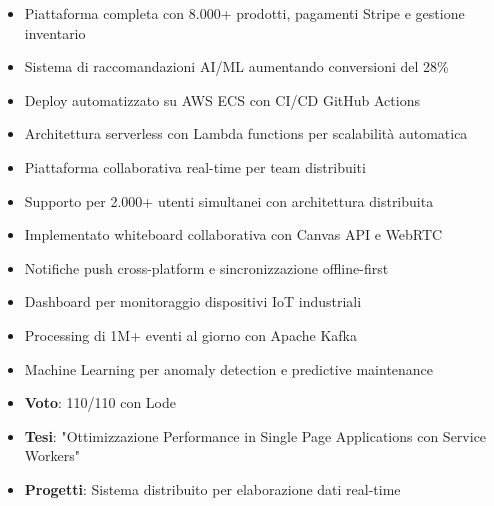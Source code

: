 \documentclass[10pt,a4paper,ragged2e,withhyper]{altacv}
\begin{document}

\begin{itemize}
\item Piattaforma completa con 8.000+ prodotti, pagamenti Stripe e gestione inventario
\item Sistema di raccomandazioni AI/ML aumentando conversioni del 28\%
\item Deploy automatizzato su AWS ECS con CI/CD GitHub Actions
\item Architettura serverless con Lambda functions per scalabilità automatica
\end{itemize}

\divider

\begin{itemize}
\item Piattaforma collaborativa real-time per team distribuiti
\item Supporto per 2.000+ utenti simultanei con architettura distribuita
\item Implementato whiteboard collaborativa con Canvas API e WebRTC
\item Notifiche push cross-platform e sincronizzazione offline-first
\end{itemize}

\divider

\begin{itemize}
\item Dashboard per monitoraggio dispositivi IoT industriali
\item Processing di 1M+ eventi al giorno con Apache Kafka
\item Machine Learning per anomaly detection e predictive maintenance
\end{itemize}


\begin{itemize}
\item \textbf{Voto}: 110/110 con Lode
\item \textbf{Tesi}: "Ottimizzazione Performance in Single Page Applications con Service Workers"
\item \textbf{Progetti}: Sistema distribuito per elaborazione dati real-time
\end{itemize}
\end{document}
